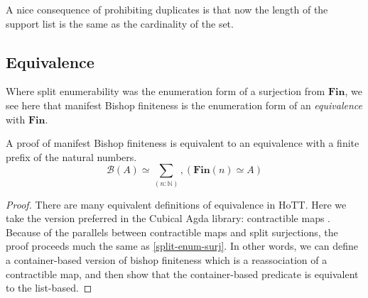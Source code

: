 A nice consequence of prohibiting duplicates is that now the length of the
support list is the same as the cardinality of the set.
\subsection{Equivalence}
Where split enumerability was the enumeration form of a surjection from
\(\mathbf{Fin}\), we see here that manifest Bishop finiteness is the enumeration
form of an \emph{equivalence} with \(\mathbf{Fin}\).
\begin{rm-lemma} \label{bishop-equiv}
  A proof of manifest Bishop finiteness is equivalent to an equivalence with a
  finite prefix of the natural numbers.
  \begin{equation}
    \mathcal{B}(A) \simeq \sum_{(n : \mathbb{N})} , \left( \mathbf{Fin}(n) \simeq A \right)
  \end{equation}
\end{rm-lemma}
\begin{proof}
  There are many equivalent definitions of equivalence in HoTT.
  Here we take the version preferred in the Cubical Agda library: contractible
  maps \cite{hottbook}.
  Because of the parallels between contractible maps and split surjections,
  the proof proceeds much the same as \ref{split-enum-surj}.
  In other words, we can define a container-based version of bishop finiteness
  which is a reassociation of a contractible map, and then show that the
  container-based predicate is equivalent to the list-based.
\end{proof}
